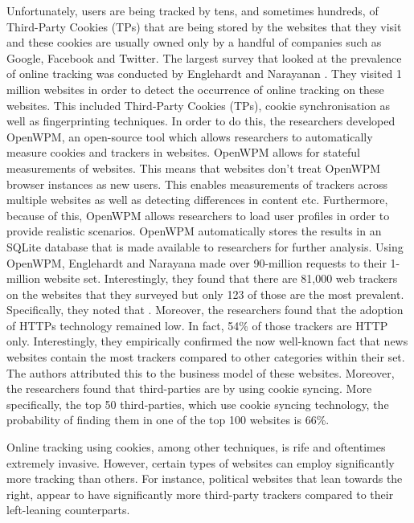 \documentclass[../main.tex]{subfiles}
\begin{document}
Unfortunately, users are being tracked by tens, and sometimes hundreds, of Third-Party Cookies (TPs) that are being stored by the websites that they visit and these cookies are usually owned only by a handful of companies such as Google, Facebook and Twitter. The largest survey that looked at the prevalence of online tracking was conducted by Englehardt and Narayanan \cite{englehardt2016online}. They visited 1 million websites in order to detect the occurrence of online tracking on these websites. This included Third-Party Cookies (TPs), cookie synchronisation as well as fingerprinting techniques. In order to do this, the researchers developed OpenWPM, an open-source tool which allows researchers to automatically measure cookies and trackers in websites. OpenWPM allows for stateful measurements of websites. This means that websites don’t treat OpenWPM browser instances as new users. This enables measurements of trackers across multiple websites as well as detecting differences in content etc. Furthermore, because of this, OpenWPM allows researchers to load user profiles in order to provide realistic scenarios. OpenWPM automatically stores the results in an SQLite database that is made available to researchers for further analysis. Using OpenWPM, Englehardt and Narayana made over 90-million requests to their 1-million website set. Interestingly, they found that there are 81,000 web trackers on the websites that they surveyed but only 123 of those are the most prevalent. Specifically, they noted that . Moreover, the researchers found that the adoption of HTTPs technology remained low. In fact, 54\% of those trackers are HTTP only. Interestingly, they empirically confirmed the now well-known fact that news websites contain the most trackers compared to other categories within their set. The authors attributed this to the business model of these websites. Moreover, the researchers found that third-parties are  by using cookie syncing. More specifically, the top 50 third-parties, which use cookie syncing technology, the probability of finding them in one of the top 100 websites is 66\%.

Online tracking using cookies, among other techniques, is rife and oftentimes extremely invasive. However, certain types of websites can employ significantly more tracking than others. For instance, political websites that lean towards the right, appear to have significantly more third-party trackers compared to their left-leaning counterparts. 
\end{document}
